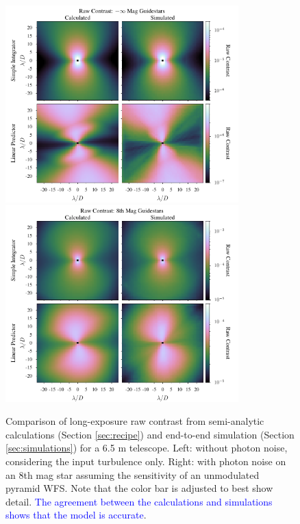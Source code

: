 \documentclass[10pt,preprint]{aastex631}
\newcommand{\jrmadd}[1]{\textcolor{blue}{#1}}
\begin{document}
\begin{figure}
\hspace{-0.3in}
\includegraphics[width=3.54in]{contrast0mag.pdf}
\includegraphics[width=3.54in]{contrast8mag.pdf}
\caption{Comparison of long-exposure raw contrast from semi-analytic calculations (Section \ref{sec:recipe}) and end-to-end simulation (Section \ref{sec:simulations}) for a 6.5 m telescope. Left: without photon noise, considering the input turbulence only.  Right: with photon noise on an 8th mag star assuming the sensitivity of an unmodulated pyramid WFS. Note that the color bar is adjusted to best show detail.  \jrmadd{The agreement between the calculations and simulations shows that the model is accurate}.\label{fig:contrast_2Dcomp}}
\end{figure}
\end{document}
